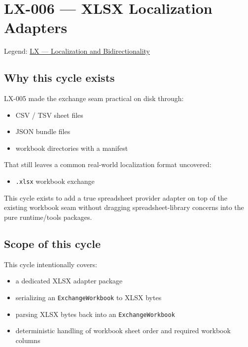 \chapter{LX-006 --- XLSX Localization Adapters}\label{record-193}

\smallskip

Legend: \href{https://github.com/flyingrobots/bijou/blob/1853ad902f6bf219326409e7f743a5a1d6517dbc/docs/legends/LX-localization-and-bidirectionality.md}{LX --- Localization and Bidirectionality}

\section{Why this cycle exists}\label{record-193-why-this-cycle-exists}

LX-005 made the exchange seam practical on disk through:

\begin{itemize}
\tightlist
\item
  CSV / TSV sheet files
\item
  JSON bundle files
\item
  workbook directories with a manifest
\end{itemize}

That still leaves a common real-world localization format uncovered:

\begin{itemize}
\tightlist
\item
  \texttt{.\allowbreak{}x\allowbreak{}l\allowbreak{}s\allowbreak{}x} workbook exchange
\end{itemize}

This cycle exists to add a true spreadsheet provider adapter on top of the existing workbook seam without dragging spreadsheet-library concerns into the pure runtime/tools packages.

\section{Scope of this cycle}\label{record-193-scope-of-this-cycle}

This cycle intentionally covers:

\begin{itemize}
\tightlist
\item
  a dedicated XLSX adapter package
\item
  serializing an \texttt{E\allowbreak{}x\allowbreak{}c\allowbreak{}h\allowbreak{}a\allowbreak{}n\allowbreak{}g\allowbreak{}e\allowbreak{}W\allowbreak{}o\allowbreak{}r\allowbreak{}k\allowbreak{}b\allowbreak{}o\allowbreak{}o\allowbreak{}k} to XLSX bytes
\item
  parsing XLSX bytes back into an \texttt{E\allowbreak{}x\allowbreak{}c\allowbreak{}h\allowbreak{}a\allowbreak{}n\allowbreak{}g\allowbreak{}e\allowbreak{}W\allowbreak{}o\allowbreak{}r\allowbreak{}k\allowbreak{}b\allowbreak{}o\allowbreak{}o\allowbreak{}k}
\item
  deterministic handling of workbook sheet order and required workbook columns
\end{itemize}

